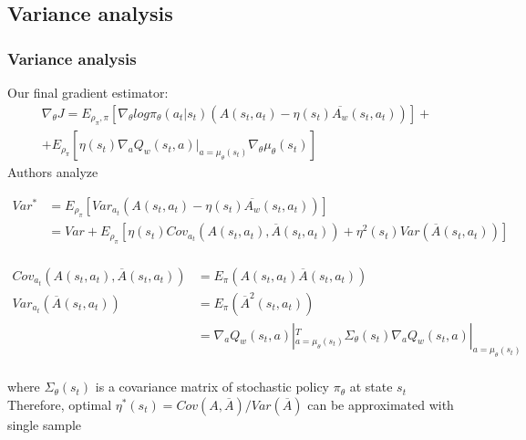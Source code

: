 \documentclass{beamer}
\begin{document}
\subsection{Variance analysis}
\begin{frame}[t]
\frametitle{Variance analysis}
Our final gradient estimator:
\begin{multline*}
\nabla_{\theta} J = E_{\rho_\pi, \pi} \left[ \nabla_{\theta} log \pi_\theta ( a_t | s_t) (A(s_t, a_t) - \eta(s_t) \overline{A_w} (s_t,a_t)) \right] + \\ + E_{\rho_\pi} \left[ \eta(s_t) \nabla_a Q_w(s_t, a) |_{a=\mu_\theta(s_t)} 
\nabla_\theta \mu_\theta(s_t)
\right]
\end{multline*}
Authors analyze 

\begin{equation*}
\begin{aligned}
Var^* &= E_{\rho_\pi} \left[ Var_{a_t}(A(s_t,a_t) - \eta(s_t) \overline{A_w} (s_t,a_t) )\right]&&\\
      &= Var + E_{\rho_\pi} \left[ \eta(s_t) Cov_{a_t} (A(s_t, a_t), \overline{A}(s_t, a_t)) + \eta^2(s_t) Var(\overline{A}(s_t, a_t)) \right]&&\\
\end{aligned}
\end{equation*}

\begin{equation*}
\begin{aligned}
 Cov_{a_t} (A(s_t, a_t), \overline{A}(s_t, a_t)) &= E_\pi (A(s_t,a_t) \overline{A}(s_t, a_t))&&\\
 Var_{a_t} (\overline{A}(s_t, a_t)) &= E_\pi (\overline{A}^2(s_t, a_t))&&\\
 &= \nabla_a Q_w(s_t, a) |_{a=\mu_\theta(s_t)}^T \Sigma_\theta(s_t) \nabla_a Q_w(s_t, a) |_{a=\mu_\theta(s_t)}&&\\
\end{aligned}
\end{equation*}

where $\Sigma_\theta(s_t)$ is a covariance matrix of stochastic policy $\pi_\theta$ at state $s_t$
\\ Therefore, optimal $\eta^*(s_t) = Cov(A,\overline{A})/Var(\overline{A})$ can be approximated with single sample


\end{frame}
\end{document}
